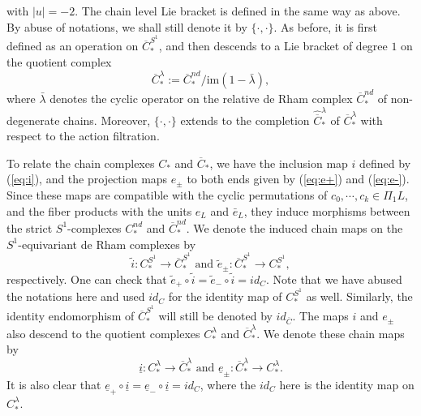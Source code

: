 \documentclass[a4paper]{article}
\numberwithin{equation}{section}
\begin{document}
with $|u|=-2$. The chain level Lie bracket is defined in the same way as above. By abuse of notations, we shall still denote it by $\{\cdot,\cdot\}$. As before, it is first defined as an operation on $\overline{C}_\ast^{S^1}$, and then descends to a Lie bracket of degree $1$ on the quotient complex
\begin{equation}
\overline{C}_\ast^\lambda:=\overline{C}_\ast^\mathit{nd}/\mathrm{im}(1-\bar{\lambda}),
\end{equation}
where $\bar{\lambda}$ denotes the cyclic operator on the relative de Rham complex $\overline{C}_\ast^\mathit{nd}$ of non-degenerate chains. Moreover, $\{\cdot,\cdot\}$ extends to the completion $\widehat{\overline{C}}_\ast^\lambda$ of $\overline{C}_\ast^\lambda$ with respect to the action filtration.

To relate the chain complexes $C_\ast$ and $\overline{C}_\ast$, we have the inclusion map $i$ defined by (\ref{eq:i}), and the projection maps $e_\pm$ to both ends given by (\ref{eq:e+}) and (\ref{eq:e-}). Since these maps are compatible with the cyclic permutations of $c_0,\cdots,c_k\in\Pi_1L$, and the fiber products with the units $e_L$ and $\bar{e}_L$, they induce morphisms between the strict $S^1$-complexes $C_\ast^\mathit{nd}$ and $\overline{C}_\ast^\mathit{nd}$. We denote the induced chain maps on the $S^1$-equivariant de Rham complexes by
\begin{equation}
\tilde{i}:C_\ast^{S^1}\rightarrow\overline{C}_\ast^{S^1}\textrm{ and }\tilde{e}_\pm:\overline{C}_\ast^{S^1}\rightarrow C_\ast^{S^1},
\end{equation}
respectively. One can check that $\tilde{e}_+\circ\tilde{i}=\tilde{e}_-\circ\tilde{i}=\mathit{id}_C$. Note that we have abused the notations here and used $\mathit{id}_C$ for the identity map of $C_\ast^{S^1}$ as well. Similarly, the identity endomorphism of $\overline{C}_\ast^{S^1}$ will still be denoted by $\mathit{id}_{\overline{C}}$. The maps $i$ and $e_\pm$ also descend to the quotient complexes $C_\ast^\lambda$ and $\overline{C}_\ast^\lambda$. We denote these chain maps by
\begin{equation}
\underline{i}:C_\ast^\lambda\rightarrow\overline{C}_\ast^\lambda\textrm{ and }\underline{e}_\pm:\overline{C}_\ast^\lambda\rightarrow C_\ast^\lambda.
\end{equation}
It is also clear that $\underline{e}_+\circ\underline{i}=\underline{e}_-\circ\underline{i}=\mathit{id}_C$, where the $\mathit{id}_C$ here is the identity map on $C_\ast^\lambda$.
\end{document}
